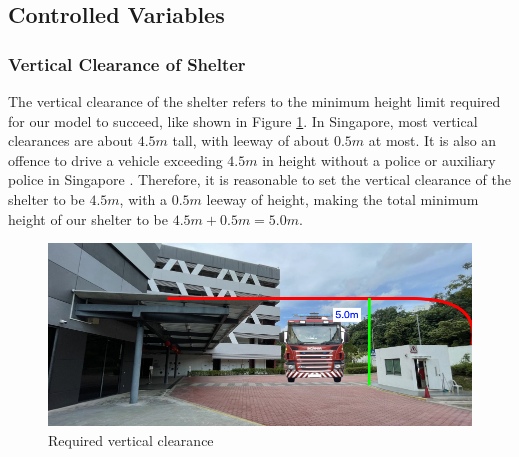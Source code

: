 \documentclass[a4paper,titlepage]{article}
\begin{document}
\subsection{Controlled Variables}\label{sec:Variables:Controlled Variables}

\subsubsection{Vertical Clearance of Shelter}

The vertical clearance of the shelter refers to the minimum height limit required for our model to succeed, like shown in Figure \ref{fig:verticalClearance}. In Singapore, most vertical clearances are about $4.5\si{m}$ tall, with leeway of about $0.5\si{m}$ at most. It is also an offence to drive a vehicle exceeding $4.5\si{m}$ in height without a police or auxiliary police in Singapore \cite{lta-overheight}. Therefore, it is reasonable to set the vertical clearance of the shelter to be $4.5\si{m}$, with a $0.5\si{m}$ leeway of height, making the total minimum height of our shelter to be $4.5\si{m}+0.5\si{m}=5.0\si{m}$.

\begin{figure}[htbp]
    \centering
    \includegraphics[width=\textwidth]{verticalClearance.png}
    \caption{Required vertical clearance}
    \label{fig:verticalClearance}
\end{figure}
\end{document}
